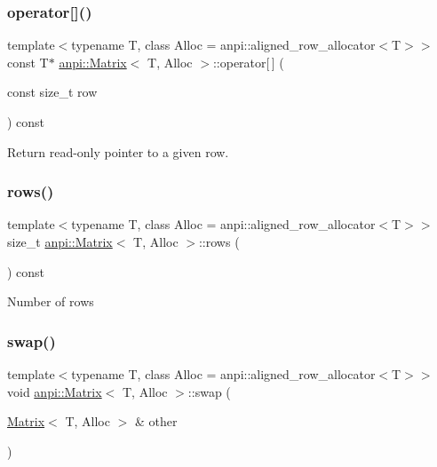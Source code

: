 \subsubsection{\texorpdfstring{operator[]()}{operator[]()}\hspace{0.1cm}{\footnotesize\ttfamily [2/2]}}
{\footnotesize\ttfamily template$<$typename T, class Alloc = anpi\+::aligned\+\_\+row\+\_\+allocator$<$\+T$>$$>$ \\
const T$\ast$ \hyperlink{classanpi_1_1Matrix}{anpi\+::\+Matrix}$<$ T, Alloc $>$\+::operator\mbox{[}$\,$\mbox{]} (\begin{DoxyParamCaption}\item[{const size\+\_\+t}]{row }\end{DoxyParamCaption}) const\hspace{0.3cm}{\ttfamily [inline]}}



Return read-\/only pointer to a given row. 

\mbox{\label{classanpi_1_1Matrix_a44ad72297afd1e3cf0b4586f004243f5}} 
\subsubsection{\texorpdfstring{rows()}{rows()}}
{\footnotesize\ttfamily template$<$typename T, class Alloc = anpi\+::aligned\+\_\+row\+\_\+allocator$<$\+T$>$$>$ \\
size\+\_\+t \hyperlink{classanpi_1_1Matrix}{anpi\+::\+Matrix}$<$ T, Alloc $>$\+::rows (\begin{DoxyParamCaption}{ }\end{DoxyParamCaption}) const\hspace{0.3cm}{\ttfamily [inline]}}

Number of rows \mbox{\label{classanpi_1_1Matrix_a137779b37d7ececd016a16398c02ee67}} 
\subsubsection{\texorpdfstring{swap()}{swap()}}
{\footnotesize\ttfamily template$<$typename T, class Alloc = anpi\+::aligned\+\_\+row\+\_\+allocator$<$\+T$>$$>$ \\
void \hyperlink{classanpi_1_1Matrix}{anpi\+::\+Matrix}$<$ T, Alloc $>$\+::swap (\begin{DoxyParamCaption}\item[{\hyperlink{classanpi_1_1Matrix}{Matrix}$<$ T, Alloc $>$ \&}]{other }\end{DoxyParamCaption})}

